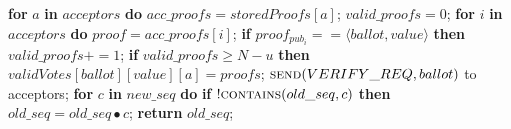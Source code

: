 \begin{algorithm}
\begin{algorithmic}[1]
		\State
		\State \hspace{\algorithmicindent} \textbf{for} $a$ \textbf{in} $acceptors$ \textbf{do}
		\State \hspace{\algorithmicindent}\hspace{\algorithmicindent} $acc\_proofs = storedProofs[a]$;
		\State \hspace{\algorithmicindent}\hspace{\algorithmicindent} $valid\_proofs = 0$;
		\State \hspace{\algorithmicindent}\hspace{\algorithmicindent} \textbf{for} $i$ \textbf{in} $acceptors$ \textbf{do}
		\State \hspace{\algorithmicindent}\hspace{\algorithmicindent}\hspace{\algorithmicindent} $proof = acc\_proofs[i]$;
		\State \hspace{\algorithmicindent}\hspace{\algorithmicindent}\hspace{\algorithmicindent} \textbf{if} $proof_{pub_i} == \langle ballot, value \rangle$ \textbf{then}
		\State \hspace{\algorithmicindent}\hspace{\algorithmicindent}\hspace{\algorithmicindent}\hspace{\algorithmicindent} 
		$valid\_proofs \mathrel{+{=}} 1$;
		\State
		\State \hspace{\algorithmicindent}\hspace{\algorithmicindent} \textbf{if} $valid\_proofs \geq N-u$ \textbf{then}
		\State \hspace{\algorithmicindent}\hspace{\algorithmicindent}\hspace{\algorithmicindent} $validVotes[ballot][value][a] = proofs$;
		\State 		
		\State \hspace{\algorithmicindent} $\Call{send}{VERIFY\_REQ, ballot}$ to acceptors;
		\EndFunction
		\State		
		\State \textbf{for} $c$ \textbf{in} $new\_seq$ \textbf{do} 
		\State \hspace{\algorithmicindent} \textbf{if} $!\Call{contains}{old\_seq,c}$ \textbf{then}
		\State \hspace{\algorithmicindent}\hspace{\algorithmicindent}\hspace{\algorithmicindent} $old\_seq =  old\_seq \bullet c$;
		\State \textbf{return} $old\_seq$;
		\EndFunction
	\end{algorithmic}
\end{algorithm}

